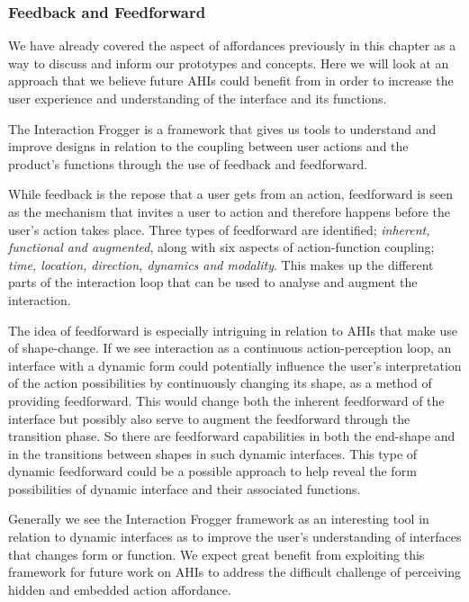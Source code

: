 \subsubsection{Feedback and Feedforward}
We have already covered the aspect of affordances previously in this chapter as a way to discuss and inform our prototypes and concepts.
Here we will look at an approach that we believe future AHIs could benefit from in order to increase the user experience and understanding of the interface and its functions.

The Interaction Frogger is a framework \citep{stienstra2012design,wensveen2004interaction} that gives us tools to understand and improve designs in relation to the coupling between user actions and the product's functions through the use of feedback and feedforward.

While feedback is the repose that a user gets from an action, feedforward is seen as the mechanism that invites a user to action and therefore happens before the user's action takes place. 
Three types of feedforward are identified; \emph{inherent, functional and augmented}, along with six aspects of action-function coupling; \emph{time, location, direction, dynamics and modality}.
This makes up the different parts of the interaction loop that can be used to analyse and augment the interaction.

The idea of feedforward is especially intriguing in relation to AHIs that make use of shape-change.
If we see interaction as a continuous action-perception loop, an interface with a dynamic form could potentially influence the user's interpretation of the action possibilities by continuously changing its shape, as a method of providing feedforward.
This would change both the inherent feedforward of the interface but possibly also serve to augment the feedforward through the transition phase.
So there are feedforward capabilities in both the end-shape and in the transitions between shapes in such dynamic interfaces.
This type of dynamic feedforward could be a possible approach to help reveal the form possibilities of dynamic interface and their associated functions.

Generally we see the Interaction Frogger framework as an interesting tool in relation to dynamic interfaces as to improve the user's understanding of interfaces that changes form or function.
We expect great benefit from exploiting this framework for future work on AHIs to address the difficult challenge of perceiving hidden and embedded action affordance.


